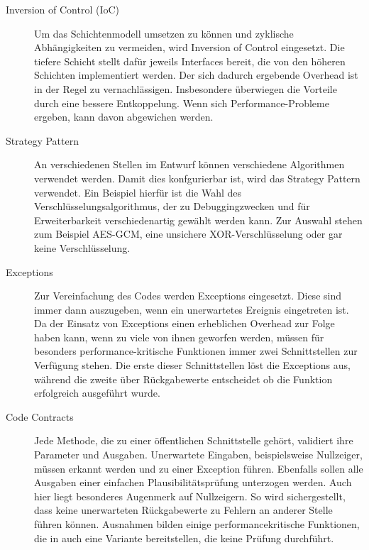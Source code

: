 \begin{description}
	\item[Inversion of Control (IoC)] 
	Um das Schichtenmodell umsetzen zu können und zyklische Abhängigkeiten zu vermeiden, wird Inversion of Control eingesetzt. 
	Die tiefere Schicht stellt dafür jeweils Interfaces bereit, die von den höheren Schichten implementiert werden. 
	Der sich dadurch ergebende Overhead ist in der Regel zu vernachlässigen.
	Insbesondere überwiegen die Vorteile durch eine bessere Entkoppelung.
	Wenn sich Performance-Probleme ergeben, kann davon abgewichen werden.
	
	\item[Strategy Pattern]
	An verschiedenen Stellen im Entwurf können verschiedene Algorithmen verwendet werden. 
	Damit dies konfgurierbar ist, wird das Strategy Pattern verwendet.
	Ein Beispiel hierfür ist die Wahl des Verschlüsselungsalgorithmus, der zu Debuggingzwecken und für Erweiterbarkeit verschiedenartig gewählt werden kann.
	Zur Auswahl stehen zum Beispiel AES-GCM, eine unsichere XOR-Verschlüsselung oder gar keine Verschlüsselung. 
	
	\item[Exceptions]
	Zur Vereinfachung des Codes werden Exceptions eingesetzt.
	Diese sind immer dann auszugeben, wenn ein unerwartetes Ereignis eingetreten ist.
	Da der Einsatz von Exceptions einen erheblichen Overhead zur Folge haben kann, wenn zu viele von ihnen geworfen werden, müssen für besonders performance-kritische Funktionen immer zwei Schnittstellen zur Verfügung stehen.
	Die erste dieser Schnittstellen löst die Exceptions aus, während die zweite über Rückgabewerte entscheidet ob die Funktion erfolgreich ausgeführt wurde.
	
	\item[Code Contracts]
	Jede Methode, die zu einer öffentlichen Schnittstelle gehört, validiert ihre Parameter und Ausgaben.
	Unerwartete Eingaben, beispielsweise Nullzeiger, müssen erkannt werden und zu einer Exception führen.
	Ebenfalls sollen alle Ausgaben einer einfachen Plausibilitätsprüfung unterzogen werden. 
	Auch hier liegt besonderes Augenmerk auf Nullzeigern.
	So wird sichergestellt, dass keine unerwarteten Rückgabewerte zu Fehlern an anderer Stelle führen können.
	Ausnahmen bilden einige performancekritische Funktionen, die in auch eine Variante bereitstellen, die keine Prüfung durchführt.
\end{description}
